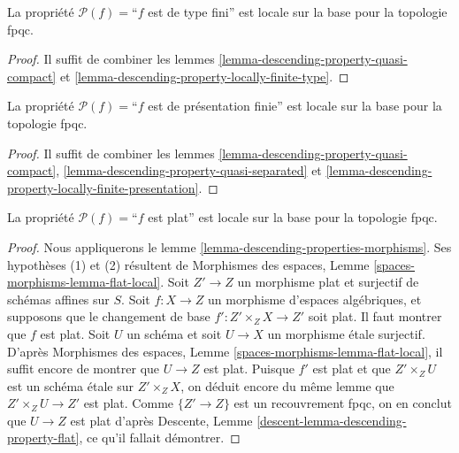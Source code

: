 \begin{lemma}
\label{lemma-descending-property-finite-type}
La propriété $\mathcal{P}(f) =$``$f$ est de type fini''
est locale sur la base pour la topologie fpqc.
\end{lemma}

\begin{proof}
Il suffit de combiner les lemmes \ref{lemma-descending-property-quasi-compact}
et \ref{lemma-descending-property-locally-finite-type}.
\end{proof}

\begin{lemma}
\label{lemma-descending-property-finite-presentation}
La propriété $\mathcal{P}(f) =$``$f$ est de présentation finie''
est locale sur la base pour la topologie fpqc.
\end{lemma}

\begin{proof}
Il suffit de combiner les lemmes \ref{lemma-descending-property-quasi-compact},
\ref{lemma-descending-property-quasi-separated} et
\ref{lemma-descending-property-locally-finite-presentation}.
\end{proof}

\begin{lemma}
\label{lemma-descending-property-flat}
La propriété $\mathcal{P}(f) =$``$f$ est plat''
est locale sur la base pour la topologie fpqc.
\end{lemma}

\begin{proof}
Nous appliquerons le
lemme \ref{lemma-descending-properties-morphisms}.
Ses hypothèses (1) et (2) résultent de
Morphismes des espaces,
Lemme \ref{spaces-morphisms-lemma-flat-local}.
Soit $Z' \to Z$ un morphisme plat et surjectif de schémas affines sur $S$.
Soit $f : X \to Z$ un morphisme d'espaces algébriques, et supposons
que le changement de base $f' : Z' \times_Z X \to Z'$ soit plat.
Il faut montrer que $f$ est plat. Soit $U$ un schéma
et soit $U \to X$ un morphisme étale surjectif. D'après
Morphismes des espaces,
Lemme \ref{spaces-morphisms-lemma-flat-local},
il suffit encore de montrer que $U \to Z$ est plat.
Puisque $f'$ est plat et que $Z' \times_Z U$ est un
schéma étale sur $Z' \times_Z X$, on déduit encore du même lemme que
$Z' \times_Z U \to Z'$ est plat.
Comme $\{Z' \to Z\}$ est un recouvrement fpqc, on en conclut que
$U \to Z$ est plat d'après
Descente, Lemme \ref{descent-lemma-descending-property-flat},
ce qu'il fallait démontrer.
\end{proof}

